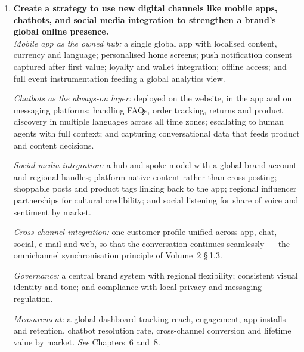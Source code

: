 \begin{enumerate}[leftmargin=2.2em,itemsep=1.4ex]
      \emph{Where it is strained by technological change:} platform fragmentation
      across devices, screen sizes and operating systems makes a single campaign
      difficult; privacy shifts --- app tracking transparency, cookie deprecation,
      GDPR and do-not-disturb regulation --- have degraded attribution and
      targeting; ad fatigue and rising uninstall rates limit push frequency; and
      the pace of format change forces continual re-skilling.

      \emph{Evaluation:} mobile marketing remains the most resilient channel
      precisely because its measurability lets it adapt faster than the disruption
      --- but only for organisations that build an owned first-party asset, namely
      an app and a permission-based list, rather than renting reach from
      platforms. \hfill\emph{See} \S\,6.4, \S\,6.5 and \S\,6.6.

\item \textbf{Create a strategy to use new digital channels like mobile apps,
      chatbots, and social media integration to strengthen a brand's global online
      presence.} \\
      \emph{Mobile app as the owned hub:} a single global app with localised
      content, currency and language; personalised home screens; push notification
      consent captured after first value; loyalty and wallet integration; offline
      access; and full event instrumentation feeding a global analytics view.

      \emph{Chatbots as the always-on layer:} deployed on the website, in the app
      and on messaging platforms; handling FAQs, order tracking, returns and
      product discovery in multiple languages across all time zones; escalating to
      human agents with full context; and capturing conversational data that feeds
      product and content decisions.

      \emph{Social media integration:} a hub-and-spoke model with a global brand
      account and regional handles; platform-native content rather than
      cross-posting; shoppable posts and product tags linking back to the app;
      regional influencer partnerships for cultural credibility; and social
      listening for share of voice and sentiment by market.

      \emph{Cross-channel integration:} one customer profile unified across app,
      chat, social, e-mail and web, so that the conversation continues seamlessly
      --- the omnichannel synchronisation principle of Volume~2 \S\,1.3.

      \emph{Governance:} a central brand system with regional flexibility;
      consistent visual identity and tone; and compliance with local privacy and
      messaging regulation.

      \emph{Measurement:} a global dashboard tracking reach, engagement, app
      installs and retention, chatbot resolution rate, cross-channel conversion and
      lifetime value by market. \hfill\emph{See} Chapters~6 and~8.

\end{enumerate}

